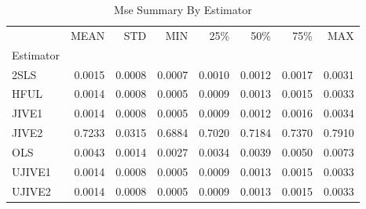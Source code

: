 \begin{table}[ht]
\centering
\caption{Mse Summary By Estimator}
\begin{tabular}{lrrrrrrr}
\toprule
 & MEAN & STD & MIN & 25\% & 50\% & 75\% & MAX \\
Estimator &  &  &  &  &  &  &  \\
\midrule
2SLS & 0.0015 & 0.0008 & 0.0007 & 0.0010 & 0.0012 & 0.0017 & 0.0031 \\
HFUL & 0.0014 & 0.0008 & 0.0005 & 0.0009 & 0.0013 & 0.0015 & 0.0033 \\
JIVE1 & 0.0014 & 0.0008 & 0.0005 & 0.0009 & 0.0012 & 0.0016 & 0.0034 \\
JIVE2 & 0.7233 & 0.0315 & 0.6884 & 0.7020 & 0.7184 & 0.7370 & 0.7910 \\
OLS & 0.0043 & 0.0014 & 0.0027 & 0.0034 & 0.0039 & 0.0050 & 0.0073 \\
UJIVE1 & 0.0014 & 0.0008 & 0.0005 & 0.0009 & 0.0013 & 0.0015 & 0.0033 \\
UJIVE2 & 0.0014 & 0.0008 & 0.0005 & 0.0009 & 0.0013 & 0.0015 & 0.0033 \\
\bottomrule
\end{tabular}
\end{table}
